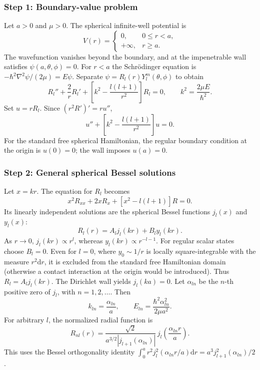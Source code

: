 \documentclass[11pt,a4paper]{article}
\newcommand{\dd}{\mathrm{d}}
\begin{document}
\subsubsection*{Step 1: Boundary-value problem}
Let \(a>0\) and \(\mu>0\). The spherical infinite-well potential is
\begin{equation}V(r)=\begin{cases}0,&0\le r<a,\\+\infty,&r\ge a.\end{cases}\end{equation}
The wavefunction vanishes beyond the boundary, and at the impenetrable wall satisfies \(\psi(a,\theta,\phi)=0\). For \(r<a\) the Schr\"odinger equation is \(-\hbar^2\nabla^2\psi/(2\mu)=E\psi\). Separate \(\psi=R_l(r)Y_l^m(\theta,\phi)\) to obtain
\begin{equation}\boxed{R_l''+\frac2rR_l'+\left[k^2-\frac{l(l+1)}{r^2}\right]R_l=0,\qquad k^2=\frac{2\mu E}{\hbar^2}.}\end{equation}
Set \(u=rR_l\). Since \((r^2R')'=ru''\),
\begin{equation}\boxed{u''+\left[k^2-\frac{l(l+1)}{r^2}\right]u=0.}\end{equation}
For the standard free spherical Hamiltonian, the regular boundary condition at the origin is \(u(0)=0\); the wall imposes \(u(a)=0\).

\subsubsection*{Step 2: General spherical Bessel solutions}
Let \(x=kr\). The equation for \(R_l\) becomes
\begin{equation}x^2R_{xx}+2xR_x+[x^2-l(l+1)]R=0.\end{equation}
Its linearly independent solutions are the spherical Bessel functions \(j_l(x)\) and \(y_l(x)\):
\begin{equation}\boxed{R_l(r)=A_lj_l(kr)+B_ly_l(kr).}\end{equation}
As \(r\to0\), \(j_l(kr)\propto r^l\), whereas \(y_l(kr)\propto r^{-l-1}\). For regular scalar states choose \(B_l=0\). Even for \(l=0\), where \(y_0\sim1/r\) is locally square-integrable with the measure \(r^2\dd r\), it is excluded from the standard free Hamiltonian domain (otherwise a contact interaction at the origin would be introduced). Thus \(R_l=A_lj_l(kr)\).
The Dirichlet wall yields \(j_l(ka)=0\). Let \(\alpha_{ln}\) be the \(n\)-th positive zero of \(j_l\), with \(n=1,2,\ldots\). Then
\begin{equation}\boxed{k_{ln}=\frac{\alpha_{ln}}a,\qquad E_{ln}=\frac{\hbar^2\alpha_{ln}^2}{2\mu a^2}.}\end{equation}
For arbitrary \(l\), the normalized radial function is
\begin{equation}\boxed{R_{nl}(r)=\frac{\sqrt2}{a^{3/2}|j_{l+1}(\alpha_{ln})|}\,j_l\!\left(\frac{\alpha_{ln}r}{a}\right).}\end{equation}
This uses the Bessel orthogonality identity \(\int_0^a r^2j_l^2(\alpha_{ln}r/a)\dd r=a^3j_{l+1}^2(\alpha_{ln})/2\).
\end{document}
